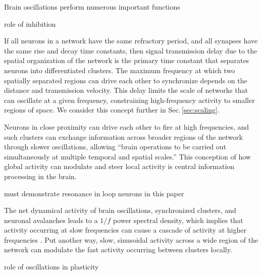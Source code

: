 \vspace{3em}
Brain oscillations perform numerous important functions

\vspace{3em}
role of inhibition

\vspace{3em}
If all neurons in a network have the same refractory period, and all synapses have the same rise and decay time constants, then signal transmission delay due to the spatial organization of the network is the primary time constant that separates neurons into differentiated clusters. The maximum frequency at which two spatially separated regions can drive each other to synchronize depends on the distance and transmission velocity. This delay limits the scale of networks that can oscillate at a given frequency, constraining high-frequency activity to smaller regions of space. We consider this concept further in Sec.\,\ref{sec:scaling}. 

\vspace{3em}
Neurons in close proximity can drive each other to fire at high frequencies, and such clusters can exchange information across broader regions of the network through slower oscillations, allowing ``brain operations to be carried out simultaneously at multiple temporal and spatial scales.'' \cite{budr2004} This conception of how global activity can modulate and steer local activity is central information processing in the brain. 

\vspace{3em}
must demonstrate resonance in loop neurons in this paper

\vspace{3em}
The net dynamical activity of brain oscillations, synchronized clusters, and neuronal avalanches leads to a $1/f$ power spectral density, which implies that activity occurring at slow frequencies can cause a cascade of activity at higher frequencies \cite{budr2004}. Put another way, slow, sinusoidal activity across a wide region of the network can modulate the fast activity occurring between clusters locally.  

\vspace{3em}
role of oscillations in plasticity \cite{bu2006,budr2004,li1997}

